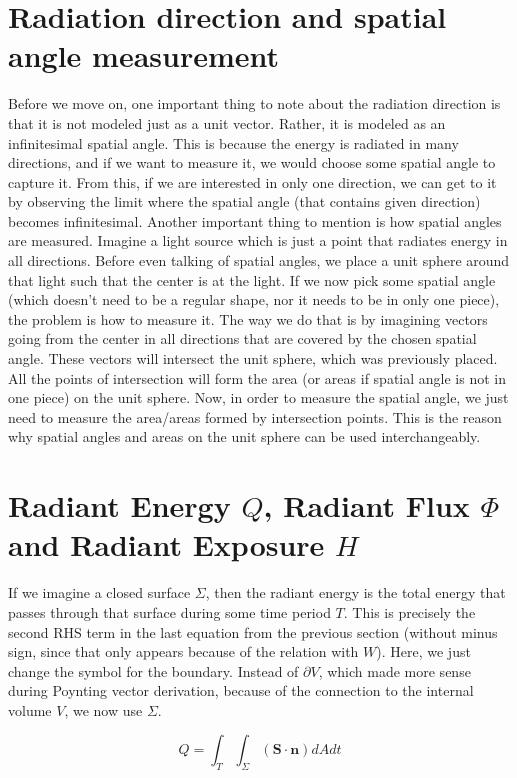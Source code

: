 \documentclass{article}
\begin{document}
\section{Radiation direction and spatial angle measurement}

Before we move on, one important thing to note about the radiation direction is that it is not modeled just as a unit vector. Rather, it is modeled as an infinitesimal spatial angle. This is because the energy is radiated in many directions, and if we want to measure it, we would choose some spatial angle to capture it. From this, if we are interested in only one direction, we can get to it by observing the limit where the spatial angle (that contains given direction) becomes infinitesimal. Another important thing to mention is how spatial angles are measured. Imagine a light source which is just a point that radiates energy in all directions. Before even talking of spatial angles, we place a unit sphere around that light such that the center is at the light. If we now pick some spatial angle (which doesn't need to be a regular shape, nor it needs to be in only one piece), the problem is how to measure it. The way we do that is by imagining vectors going from the center in all directions that are covered by the chosen spatial angle. These vectors will intersect the unit sphere, which was previously placed. All the points of intersection will form the area (or areas if spatial angle is not in one piece) on the unit sphere. Now, in order to measure the spatial angle, we just need to measure the area/areas formed by intersection points. This is the reason why spatial angles and areas on the unit sphere can be used interchangeably.

\section{Radiant Energy $Q$, Radiant Flux $\Phi$ and Radiant Exposure $H$}

If we imagine a closed surface $\Sigma$, then the radiant energy is the total energy that passes through that surface during some time period $T$. This is precisely the second RHS term in the last equation from the previous section (without minus sign, since that only appears because of the relation with $W$). Here, we just change the symbol for the boundary. Instead of $\partial V$, which made more sense during Poynting vector derivation, because of the connection to the internal volume $V$, we now use $\Sigma$.

\[ Q = \int_{T}\int_{\Sigma} (\mathbf{S} \cdot \mathbf{n})dAdt \]
\end{document}
